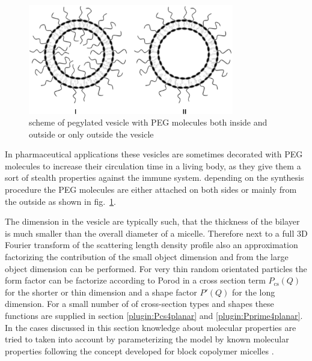 \begin{figure}[htb]
\begin{center}
\includegraphics[width=0.8\textwidth]{../images/form_factor/vesicles/pegylated_liposome.png}
\end{center}
\caption{scheme of pegylated vesicle with PEG molecules both inside and outside or only outside the vesicle}
\label{fig:pegylated_vesicle}
\end{figure}

In pharmaceutical applications these vesicles are sometimes  decorated with PEG molecules to increase their circulation time in a living body, as they give them a sort of stealth properties against the immune system. depending on the synthesis procedure the PEG molecules are either attached on both sides or mainly from the outside as shown in fig.\ \ref{fig:pegylated_vesicle}.

The dimension in the vesicle are typically such, that the thickness of the bilayer is much smaller than the overall diameter of a micelle. Therefore next to a full 3D Fourier transform of the scattering length density profile also an approximation factorizing the contribution of the small object dimension and from the large object dimension can be performed. For very thin random orientated particles the form factor can be factorize according to Porod \cite{Porod1948} in a cross
section term $P_\text{cs}(Q)$ for the shorter or thin dimension and a shape factor $P'(Q)$ for the long dimension. For a small number of of cross-section types and shapes these functions are supplied in section \ref{plugin:Pcs4planar} and \ref{plugin:Pprime4planar}. In the cases discussed in this section knowledge about molecular properties are tried to taken into account by parameterizing the model by known molecular properties following the concept developed for block copolymer micelles \cite{PedersenGerstenberg96}.

~\\

